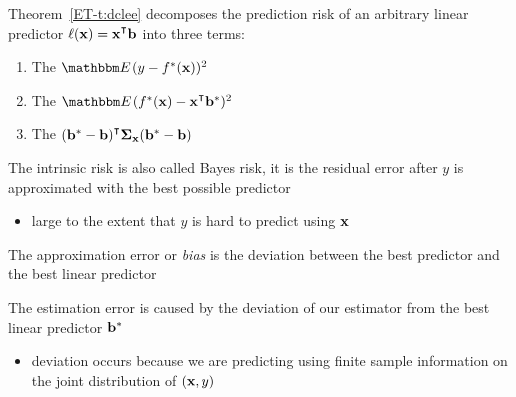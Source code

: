 \begin{frame}
    
    \vspace{2em}
    Theorem~\ref{ET-t:dclee} decomposes the prediction risk of an
    arbitrary linear predictor $\ell (\boldx) = \boldx^\T \boldb$
    into three terms:
    \begin{enumerate}
        \label{enum:tr}
        \item The  $\EE (y - f^*(\boldx))^2 $
        \item The  $\EE (f^*(\boldx) - \boldx^\T
            \boldb^*)^2 $
        \item The  $ (\boldb^* - \boldb)^\T 
        \Sigmax (\boldb^* - \boldb)$
    \end{enumerate}

\end{frame}
  
 \begin{frame}
    
    \vspace{2em}
    The intrinsic risk is also called Bayes risk, it is the residual error after $y$ 
    is approximated with the best possible predictor
    \begin{itemize}
        \item large to the extent
        that $y$ is hard to predict using ${\mathbf x}$
    \end{itemize}
    
    \vspace{.7em}
    The approximation error or \emph{bias} is the deviation between the best
    predictor and the best linear predictor

\end{frame}

\begin{frame}

    \vspace{2em}
    The estimation error is caused by the deviation of our estimator
    from the best linear predictor ${\mathbf b}^*$
    \begin{itemize}
        \item deviation occurs because
    we are predicting using finite sample information on the joint
    distribution of $({\mathbf x}, y)$
    \end{itemize}
    
\end{frame}

